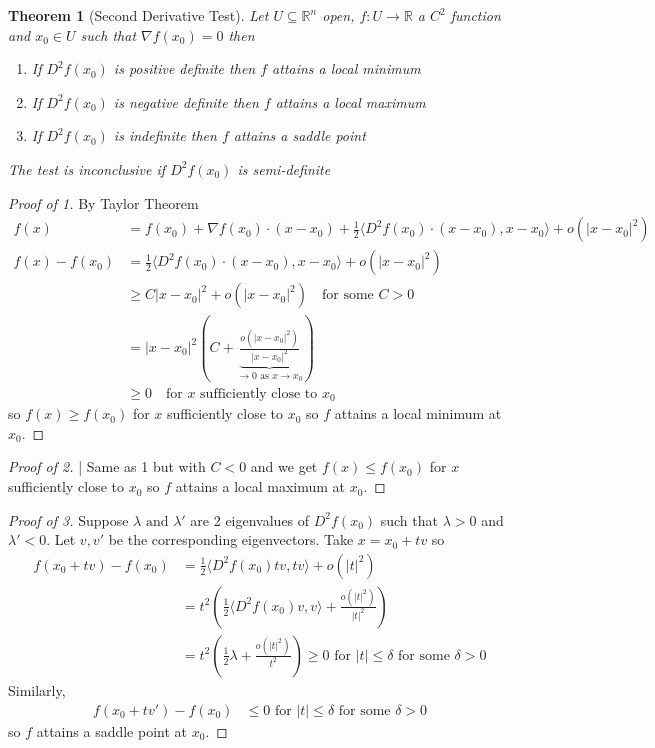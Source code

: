 \documentclass[11pt,openany]{book}
\theoremstyle{plain}
\newtheorem{theorem}{Theorem}[chapter]
\theoremstyle{definition}
\theoremstyle{remark}
\newcommand{\R}{\mathbb{R}}
\newcommand{\inner}[1]{\langle #1 \rangle}
\begin{document}
\begin{theorem}[Second Derivative Test]
    Let $U \subseteq \R^n$ open, $f: U \to \R$ a $C^2$ function and $x_0 \in U$ such that $\nabla f(x_0) = 0$ then  
    \begin{enumerate}
        \item If $D^2f(x_0)$ is positive definite then $f$ attains a local minimum
        \item If $D^2f(x_0)$ is negative definite then $f$ attains a local maximum
        \item If $D^2f(x_0)$ is indefinite then $f$ attains a saddle point
    \end{enumerate}
The test is inconclusive if $D^2f(x_0)$ is semi-definite

\end{theorem}
\begin{proof}[Proof of 1]
By Taylor Theorem
    \begin{align*}
    f(x) &= f(x_0)+\nabla f(x_0)\cdot (x-x_0)+ \frac{1}{2} \inner{D^2f(x_0)\cdot (x-x_0),x-x_0}+ o(|x-x_0|^2)\\
    f(x)-f(x_0) &= \frac{1}{2} \inner{D^2f(x_0)\cdot (x-x_0),x-x_0}+ o(|x-x_0|^2) \\
    &\ge C|x-x_0|^2 + o(|x-x_0|^2) \quad \text{for some } C > 0\\
    &= |x-x_0|^2\left(C+\underbrace{\frac{o(|x-x_0|^2)}{|x-x_0|^2}}_{\to 0 \text{ as } x \to x_0}\right) \\
    &\ge 0 \quad \text{for } x \text{ sufficiently close to } x_0
    \end{align*}
    so $f(x) \ge f(x_0)$ for $x$ sufficiently close to $x_0$ so $f$ attains a local minimum at $x_0$.
\end{proof}
\begin{proof}[Proof of 2]
    | Same as 1 but with $C < 0$ and we get $f(x) \le f(x_0)$ for $x$ sufficiently close to $x_0$ so $f$ attains a local maximum at $x_0$.
\end{proof}
\begin{proof}[Proof of 3]
    Suppose $\lambda \text{ and } \lambda'$ are 2 eigenvalues of $D^2f(x_0)$ such that $\lambda > 0$ and $\lambda' < 0$. Let $v, v'$ be the corresponding eigenvectors. Take $x = x_0+tv$ so 
    \begin{align*}
    f(x_0+tv) -f(x_0) &= \frac{1}{2}\inner{D^2f(x_0)tv,tv}+o(|t|^2)\\
    &= t^2\left(\frac{1}{2} \inner{D^2f(x_0)v,v}+\frac{o(|t|^2)}{|t|^2}\right)\\
    &= t^2\left(\frac12 \lambda + \frac{o(|t|^2)}{t^2}\right) \ge 0 \text{ for } |t|\le \delta \text{ for some } \delta > 0
    \end{align*}
    Similarly, 
    \begin{align*}
    f(x_0+tv') - f(x_0) &\le 0 \text{ for } |t|\le \delta \text{ for some } \delta > 0
    \end{align*}
    so $f$ attains a saddle point at $x_0$.
\end{proof}
\end{document}
